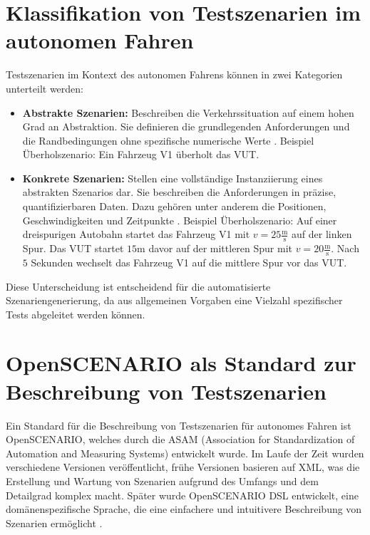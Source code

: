 \section{Klassifikation von Testszenarien im autonomen Fahren}
Testszenarien im Kontext des autonomen Fahrens können in zwei Kategorien unterteilt werden:
\begin{itemize}
    \item \textbf{Abstrakte Szenarien:}
    Beschreiben die Verkehrssituation auf einem hohen Grad an Abstraktion. Sie definieren die grundlegenden Anforderungen und die Randbedingungen ohne spezifische numerische Werte \cite{EinfuehrungIntegrationsprojekt}.
    \newline Beispiel Überholszenario: Ein Fahrzeug V1 überholt das VUT.
    \item \textbf{Konkrete Szenarien:}
    Stellen eine vollständige Instanziierung eines abstrakten Szenarios dar. Sie beschreiben die Anforderungen in präzise, quantifizierbaren Daten. Dazu gehören unter anderem die Positionen, Geschwindigkeiten und Zeitpunkte \cite{EinfuehrungIntegrationsprojekt}.
    \newline Beispiel Überholszenario: Auf einer dreispurigen Autobahn startet das Fahrzeug V1 mit $v = 25 \frac{\text{m}}{\text{s}}$ auf der linken Spur. Das VUT startet $15 \text{m}$ davor auf der mittleren Spur mit $v = 20 \frac{\text{m}}{\text{s}}$. Nach $5$ Sekunden wechselt das Fahrzeug V1 auf die mittlere Spur vor das VUT.
\end{itemize}
Diese Unterscheidung ist entscheidend für die automatisierte Szenariengenerierung, da aus allgemeinen Vorgaben eine Vielzahl spezifischer Tests abgeleitet werden können.

\section{OpenSCENARIO als Standard zur Beschreibung von Testszenarien}



Ein Standard für die Beschreibung von Testszenarien für autonomes Fahren ist OpenSCENARIO, welches durch die ASAM (Association for Standardization of Automation and Measuring Systems) entwickelt wurde.
Im Laufe der Zeit wurden verschiedene Versionen veröffentlicht, frühe Versionen basieren auf XML, was die Erstellung und Wartung von Szenarien aufgrund des Umfangs und dem Detailgrad komplex macht.
Später wurde OpenSCENARIO DSL entwickelt, eine domänenspezifische Sprache, die eine einfachere und intuitivere Beschreibung von Szenarien ermöglicht \cite{EinfuehrungIntegrationsprojekt}.

